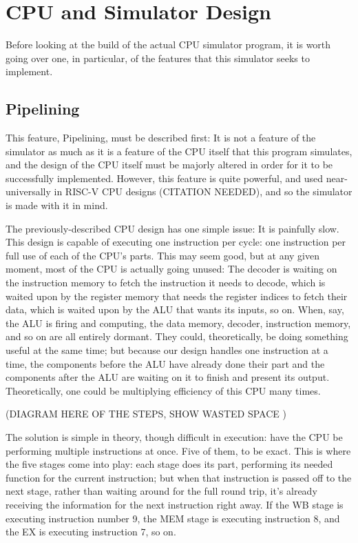 \documentclass[12pt,twoside]{reedthesis}
\begin{document}
\chapter{CPU and Simulator Design}

Before looking at the build of the actual CPU simulator program, it is worth going over one, in particular, of the features that this simulator seeks to implement.

\section{Pipelining}

This feature, Pipelining, must be described first: It is not a feature of the simulator as much as it is a feature of the CPU itself that this program simulates, and the design of the CPU itself must be majorly altered in order for it to be successfully implemented. However, this feature is quite powerful, and used near-universally in RISC-V CPU designs (CITATION NEEDED), and so the simulator is made with it in mind.

The previously-described CPU design has one simple issue: It is painfully slow. This design is capable of executing one instruction per cycle: one instruction per full use of each of the CPU's parts. This may seem good, but at any given moment, most of the CPU is actually going unused: The decoder is waiting on the instruction memory to fetch the instruction it needs to decode, which is waited upon by the register memory that needs the register indices to fetch their data, which is waited upon by the ALU that wants its inputs, so on.
When, say, the ALU is firing and computing, the data memory, decoder, instruction memory, and so on are all entirely dormant. They could, theoretically, be doing something useful at the same time; but because our design handles one instruction at a time, the components before the ALU have already done their part and the components after the ALU are waiting on it to finish and present its output. Theoretically, one could be multiplying efficiency of this CPU many times.

(DIAGRAM HERE OF THE STEPS, SHOW WASTED SPACE )

The solution is simple in theory, though difficult in execution: have the CPU be performing multiple instructions at once. Five of them, to be exact. This is where the five stages come into play: each stage does its part, performing its needed function for the current instruction; but when that instruction is passed off to the next stage, rather than waiting around for the full round trip, it's already receiving the information for the next instruction right away. If the WB stage is executing instruction number 9, the MEM stage is executing instruction 8, and the EX is executing instruction 7, so on.
\end{document}
